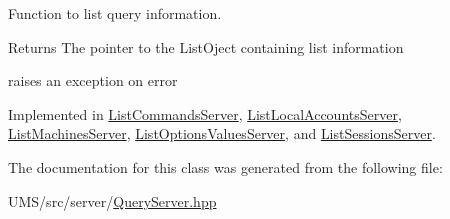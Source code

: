 Function to list query information. 

\begin{DoxyReturn}{Returns}
The pointer to the ListOject containing list information 

raises an exception on error 
\end{DoxyReturn}


Implemented in \hyperlink{classListCommandsServer_ae256dad4b7cb57e73dd3dc2c5dcb3e7b}{ListCommandsServer}, \hyperlink{classListLocalAccountsServer_aab1471d2b577b25471f12652b6e78b31}{ListLocalAccountsServer}, \hyperlink{classListMachinesServer_abbaceb388d6ad47bc9e82a3f33e978a3}{ListMachinesServer}, \hyperlink{classListOptionsValuesServer_a193d667fd5fa247300cebd4af85785d6}{ListOptionsValuesServer}, and \hyperlink{classListSessionsServer_a2ce41ba3a29999d9ef1799c990d29b29}{ListSessionsServer}.



The documentation for this class was generated from the following file:\begin{DoxyCompactItemize}
\item 
UMS/src/server/\hyperlink{QueryServer_8hpp}{QueryServer.hpp}\end{DoxyCompactItemize}
